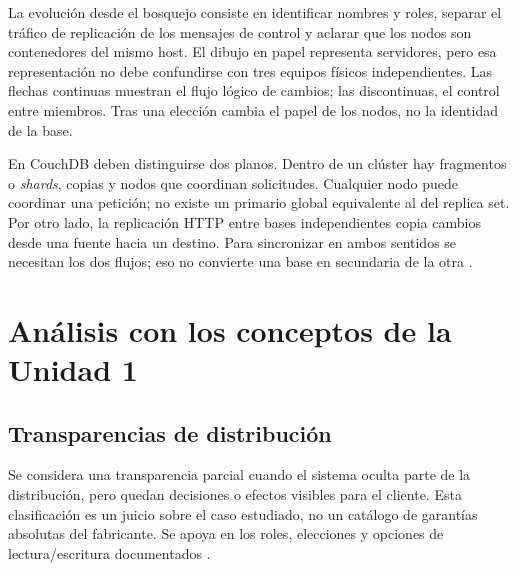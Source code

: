 La evolución desde el bosquejo consiste en identificar nombres y roles, separar el tráfico de replicación de los mensajes de control y aclarar que los nodos son contenedores del mismo host. El dibujo en papel representa servidores, pero esa representación no debe confundirse con tres equipos físicos independientes. Las flechas continuas muestran el flujo lógico de cambios; las discontinuas, el control entre miembros. Tras una elección cambia el papel de los nodos, no la identidad de la base.

En CouchDB deben distinguirse dos planos. Dentro de un clúster hay fragmentos o \textit{shards}, copias y nodos que coordinan solicitudes. Cualquier nodo puede coordinar una petición; no existe un primario global equivalente al del replica set. Por otro lado, la replicación HTTP entre bases independientes copia cambios desde una fuente hacia un destino. Para sincronizar en ambos sentidos se necesitan los dos flujos; eso no convierte una base en secundaria de la otra \cite{CouchShards,CouchReplication}.

\section{Análisis con los conceptos de la Unidad 1}
\subsection{Transparencias de distribución}
Se considera una transparencia parcial cuando el sistema oculta parte de la distribución, pero quedan decisiones o efectos visibles para el cliente. Esta clasificación es un juicio sobre el caso estudiado, no un catálogo de garantías absolutas del fabricante. Se apoya en los roles, elecciones y opciones de lectura/escritura documentados \cite{MongoReplication,MongoElections,MongoWriteConcern}.

